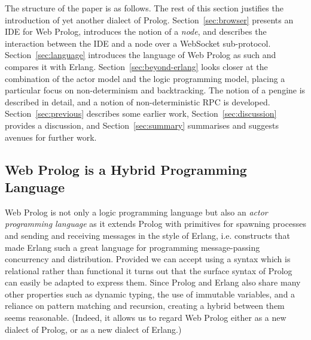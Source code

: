 \documentclass{tlp}
\begin{document}
The structure of the paper is as follows. The rest of this section justifies the introduction of yet another dialect of Prolog. Section~\ref{sec:browser} presents an IDE for Web Prolog, introduces the notion of a \textit{node}, and describes the interaction between the IDE and a node over a WebSocket sub-protocol. Section~\ref{sec:language} introduces the language of Web Prolog as such and compares it with Erlang. Section~\ref{sec:beyond-erlang} looks closer at the combination of the actor model and the logic programming model, placing a particular focus on non-determinism and backtracking. The notion of a pengine is described in detail, and a notion of non-deterministic RPC is developed. Section~\ref{sec:previous} describes some earlier work, Section~\ref{sec:discussion} provides a discussion, and Section~\ref{sec:summary} summarises and suggests avenues for further work.


\subsection{Web Prolog is a Hybrid Programming Language}\label{sec:hybrid}

%

\noindent Web Prolog is not only a logic programming language but also an \textit{actor programming language} as it extends Prolog with primitives for spawning processes and sending and receiving messages in the style of Erlang, i.e. constructs that made Erlang such a great language for programming message-passing concurrency and distribution. Provided we can accept using a syntax which is relational rather than functional it turns out that the surface syntax of Prolog can easily be adapted to express them. Since Prolog and Erlang also share many other properties such as dynamic typing, the use of immutable variables, and a reliance on pattern matching and recursion, creating a hybrid between them seems reasonable. (Indeed, it allows us to regard Web Prolog either as a new dialect of Prolog, or as a new dialect of Erlang.)
\end{document}
